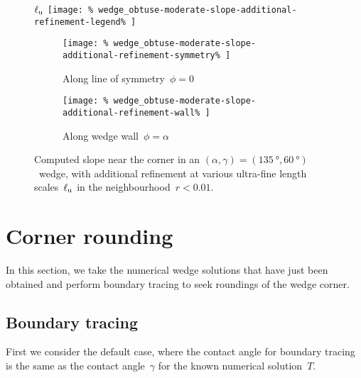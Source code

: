 \begin{figure}
  \newcommand*{\subfigurewidth}{0.45\textwidth}
  \centering
  $\ell_{\mathrm{u}}$
  \texttt{[image: \%
    wedge\_obtuse-moderate-slope-additional-refinement-legend\%
  ]}
  \hspace*{\fill}
  \begin{subfigure}[t]{\subfigurewidth}
    \texttt{[image: \%
      wedge\_obtuse-moderate-slope-additional-refinement-symmetry\%
    ]}
    \caption{%
      Along line of symmetry~$\phi = 0$
    }
    \label{fig:wedge_obtuse-moderate-additional-refinement-symmetry}
  \end{subfigure}
    \hfill
  \begin{subfigure}[t]{\subfigurewidth}
    \texttt{[image: \%
      wedge\_obtuse-moderate-slope-additional-refinement-wall\%
    ]}
    \caption{%
      Along wedge wall~$\phi = \alpha$
    }
    \label{fig:wedge_obtuse-moderate-additional-refinement-wall}
  \end{subfigure}
  \hspace*{\fill}
  \caption{
    Computed slope near the corner
    in an $(\alpha, \gamma) = (\SI{135}{\degree}, \SI{60}{\degree})$~wedge,
    with additional refinement
    at various ultra-fine length scales~$\ell_{\mathrm{u}}$
    in the neighbourhood~$r < 0.01$.
  }
  \label{fig:wedge_obtuse-moderate-additional-refinement}
\end{figure}

\section{Corner rounding}
\label{sec:re-entrant.rounding}

In this section,
we take the numerical wedge solutions that have just been obtained
and perform boundary tracing
to seek roundings of the wedge corner.

\subsection{Boundary tracing}
\label{sec:re-entrant.rounding.tracing}

First we consider the default case,
where the contact angle for boundary tracing
is the same as the contact angle~$\gamma$
for the known numerical solution~$T$.


